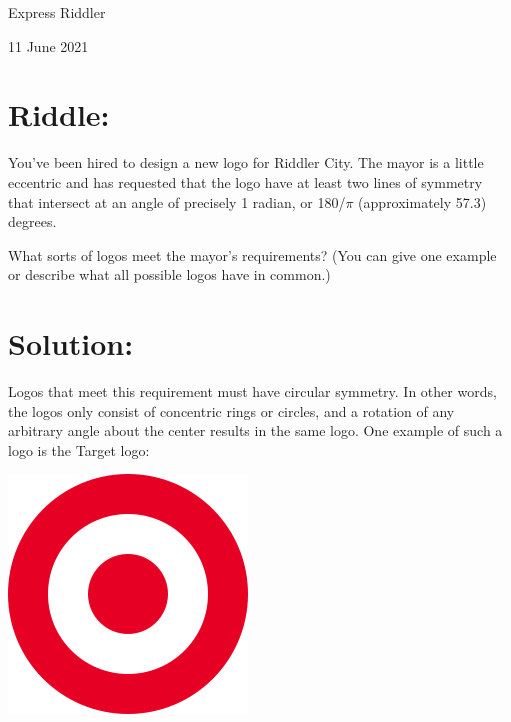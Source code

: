 \documentclass{article}
\begin{document}
\pagestyle{empty} %

\begin{center}
{\LARGE Express Riddler}

\vspace{0.15in}

{\Large 11 June 2021}
\end{center}


\section*{Riddle:}

You've been hired to design a new logo for Riddler City.
The mayor is a little eccentric and has requested that the logo have at least two lines of symmetry that intersect at an angle of precisely 1 radian, or 180/$\pi$ (approximately 57.3) degrees.

What sorts of logos meet the mayor's requirements?
(You can give one example or describe what all possible logos have in common.)


\section*{Solution:}

Logos that meet this requirement must have circular symmetry.
In other words, the logos only consist of concentric rings or circles, and a rotation of any arbitrary angle about the center results in the same logo.
One example of such a logo is the Target logo:

\vspace{0.1in}
\begin{center}
\includegraphics[width=2.5in]{target.png}
\end{center}
\vspace{0.1in}
\end{document}
